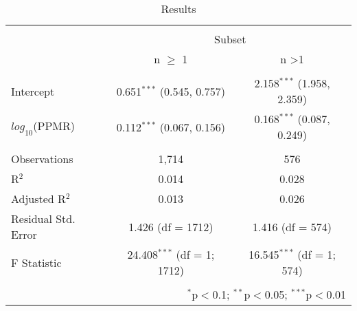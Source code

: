 
\begin{table}[!htbp] \centering 
  \caption{Results} 
  \label{tab:n-ppmr} 
\begin{tabular}{@{\extracolsep{5pt}}lcc} 
\\[-1.8ex]\hline 
\hline \\[-1.8ex] 
 & \multicolumn{2}{c}{Subset} \\ 
\cline{2-3} 
 & n $\geq$ 1 & n \textgreater 1 \\ 
\hline \\[-1.8ex] 
 Intercept & 0.651$^{***}$ (0.545, 0.757) & 2.158$^{***}$ (1.958, 2.359) \\ 
  $log_{10}$(PPMR) & 0.112$^{***}$ (0.067, 0.156) & 0.168$^{***}$ (0.087, 0.249) \\ 
 \hline \\[-1.8ex] 
Observations & 1,714 & 576 \\ 
R$^{2}$ & 0.014 & 0.028 \\ 
Adjusted R$^{2}$ & 0.013 & 0.026 \\ 
Residual Std. Error & 1.426 (df = 1712) & 1.416 (df = 574) \\ 
F Statistic & 24.408$^{***}$ (df = 1; 1712) & 16.545$^{***}$ (df = 1; 574) \\ 
\hline 
\hline \\[-1.8ex] 
\multicolumn{3}{r}{$^{*}$p$<$0.1; $^{**}$p$<$0.05; $^{***}$p$<$0.01} \\ 
\end{tabular} 
\end{table} 
